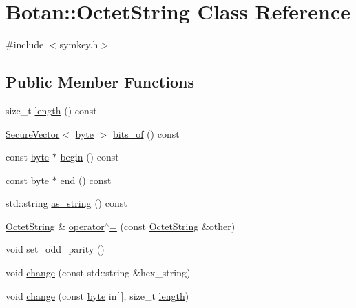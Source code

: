 \hypertarget{classBotan_1_1OctetString}{\section{Botan\-:\-:Octet\-String Class Reference}
\label{classBotan_1_1OctetString}
}


{\ttfamily \#include $<$symkey.\-h$>$}

\subsection*{Public Member Functions}
\begin{DoxyCompactItemize}
\item 
size\-\_\-t \hyperlink{classBotan_1_1OctetString_a26259a99efb6b38c9ce3af7e6a51e55c}{length} () const 
\item 
\hyperlink{classBotan_1_1SecureVector}{Secure\-Vector}$<$ \hyperlink{namespaceBotan_a7d793989d801281df48c6b19616b8b84}{byte} $>$ \hyperlink{classBotan_1_1OctetString_a97c70995fa345c1ea307fa28b0225ca9}{bits\-\_\-of} () const 
\item 
const \hyperlink{namespaceBotan_a7d793989d801281df48c6b19616b8b84}{byte} $\ast$ \hyperlink{classBotan_1_1OctetString_aab1a7fb8b18c309d0d8047b986ebf880}{begin} () const 
\item 
const \hyperlink{namespaceBotan_a7d793989d801281df48c6b19616b8b84}{byte} $\ast$ \hyperlink{classBotan_1_1OctetString_a3b84195f8766997dad8173431e0e14c5}{end} () const 
\item 
std\-::string \hyperlink{classBotan_1_1OctetString_a79cee0259b9590c9fd5607be3e267565}{as\-\_\-string} () const 
\item 
\hyperlink{classBotan_1_1OctetString}{Octet\-String} \& \hyperlink{classBotan_1_1OctetString_a328cd8c2c14bd97636bca0b4730ab7f5}{operator$^\wedge$=} (const \hyperlink{classBotan_1_1OctetString}{Octet\-String} \&other)
\item 
void \hyperlink{classBotan_1_1OctetString_a0e61484ad57061a6db7747ffd463b713}{set\-\_\-odd\-\_\-parity} ()
\item 
void \hyperlink{classBotan_1_1OctetString_a8ae294bf500bf27d202fb26292f08826}{change} (const std\-::string \&hex\-\_\-string)
\item 
void \hyperlink{classBotan_1_1OctetString_ac947c3c32841ca615c2c825818a5e404}{change} (const \hyperlink{namespaceBotan_a7d793989d801281df48c6b19616b8b84}{byte} in\mbox{[}$\,$\mbox{]}, size\-\_\-t \hyperlink{classBotan_1_1OctetString_a26259a99efb6b38c9ce3af7e6a51e55c}{length})

\end{DoxyCompactItemize}
